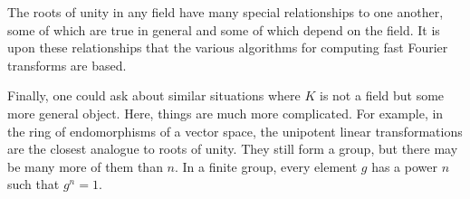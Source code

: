 \documentclass{article}
\begin{document}
The roots of unity in any field have many special relationships to one
another, some of which are true in general and some of which depend on
the field.  It is upon these relationships that the various algorithms
for computing fast Fourier transforms are based.

Finally, one could ask about similar situations where $K$ is not a
field but some more general object.  Here, things are much more
complicated.  For example, in the ring of endomorphisms of a vector
space, the unipotent linear transformations are the closest analogue
to roots of unity.  They still form a group, but there may be many
more of them than $n$.  In a finite group, every element $g$ has a
power $n$ such that $g^n=1$.

\end{document}
